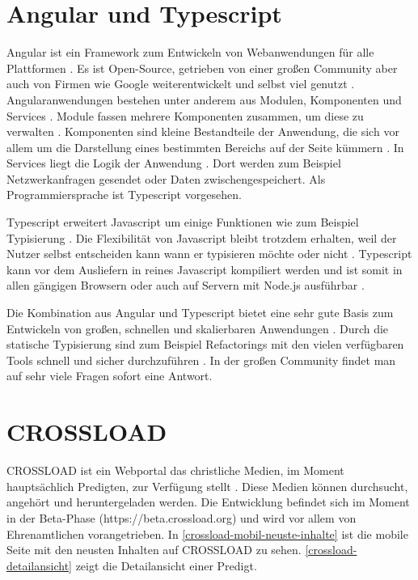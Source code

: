 \section{Angular und Typescript}
Angular ist ein Framework zum Entwickeln von Webanwendungen für alle Plattformen \autocite{angular-io}. Es ist Open-Source, getrieben von einer großen Community aber auch von Firmen wie Google weiterentwickelt und selbst viel genutzt \autocite{angular-io}. Angularanwendungen bestehen unter anderem aus Modulen, Komponenten und Services \autocite{angular-start}. Module fassen mehrere Komponenten zusammen, um diese zu verwalten \autocite{angular-start}. Komponenten sind kleine Bestandteile der Anwendung, die sich vor allem um die Darstellung eines bestimmten Bereichs auf der Seite kümmern \autocite{angular-start}. In Services liegt die Logik der Anwendung \autocite{angular-start}. Dort werden zum Beispiel Netzwerkanfragen gesendet oder Daten zwischengespeichert. Als Programmiersprache ist Typescript vorgesehen. 

Typescript erweitert Javascript um einige Funktionen wie zum Beispiel Typisierung \autocite{typescript-org}. Die Flexibilität von Javascript bleibt trotzdem erhalten, weil der Nutzer selbst entscheiden kann wann er typisieren möchte oder nicht \autocite{typescript-org}. Typescript kann vor dem Ausliefern in reines Javascript kompiliert werden und ist somit in allen gängigen Browsern oder auch auf Servern mit Node.js ausführbar \autocite{typescript-org}.

Die Kombination aus Angular und Typescript bietet eine sehr gute Basis zum Entwickeln von großen, schnellen und skalierbaren Anwendungen \autocite{angular-io}. Durch die statische Typisierung sind zum Beispiel Refactorings mit den vielen verfügbaren Tools schnell und sicher durchzuführen \autocite{typescript-org} \autocite{angular-io}. In der großen Community findet man auf sehr viele Fragen sofort eine Antwort.

\section{CROSSLOAD}
CROSSLOAD ist ein Webportal das christliche Medien, im Moment hauptsächlich Predigten, zur Verfügung stellt \autocite{crossload-org}. Diese Medien können durchsucht, angehört und heruntergeladen werden. Die Entwicklung befindet sich im Moment in der Beta-Phase (https://beta.crossload.org) und wird vor allem von Ehrenamtlichen vorangetrieben. In \autoref{crossload-mobil-neuste-inhalte} ist die mobile Seite mit den neusten Inhalten auf CROSSLOAD zu sehen. \autoref{crossload-detailansicht} zeigt die Detailansicht einer Predigt.

